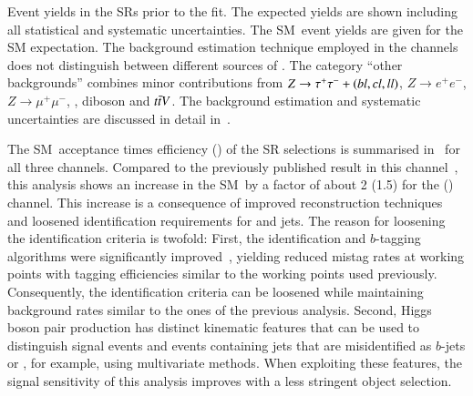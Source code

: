 \begin{table}[htbp]
  \centering

  \caption[Event yields in the SRs prior to the fit.]{Event yields in the SRs
    prior to the fit. The expected yields are shown including all statistical
    and systematic uncertainties. The SM~\HH event yields are given for the SM
    expectation. The \faketauhadvis background estimation technique employed in
    the \lephad channels does not distinguish between different sources of
    \faketauhadvis. The category ``other backgrounds'' combines minor
    contributions from $Z \to \tau^{+} \tau^{-} + (bl,cl,ll)$, $Z \to e^{+}e^{-}$,
    $Z \to \mu^{+}\mu^{-}$, \Wjets, diboson and $t\bar{t} V$. The background
    estimation and systematic uncertainties are discussed in detail
    in~.}%
  \label{tab:smhh_prefit_yields}%
  \label{tab:hadhad_presel_yields}

  \resizebox{\textwidth}{!}{
    
  }
\end{table}

The SM~\HH acceptance times efficiency (\AccTimesEff) of the SR selections is
summarised in~ for all three channels. Compared
to the previously published result in this
channel~\cite{HIGG-2016-16-witherratum}, this analysis shows an increase in the
SM~\HH \AccTimesEff by a factor of about 2 (1.5) for the \hadhad (\lephad)
channel. This increase is a consequence of improved \tauhadvis reconstruction
techniques and loosened identification requirements for \tauhadvis and \btagged
jets.
The reason for loosening the identification criteria is twofold: First, the
\tauhadvis identification and $b$-tagging algorithms were significantly
improved~\cite{ATL-PHYS-PUB-2019-033,FTAG-2019-07}, yielding reduced mistag
rates at working points with tagging efficiencies similar to the working points
used previously. Consequently, the identification criteria can be loosened while
maintaining background rates similar to the ones of the previous analysis.
Second, Higgs boson pair production has distinct kinematic features that can be
used to distinguish signal events and events containing jets that are
misidentified as $b$-jets or \tauhadvis, for example, using multivariate
methods. When exploiting these features, the signal sensitivity of this analysis
improves with a less stringent object selection.



